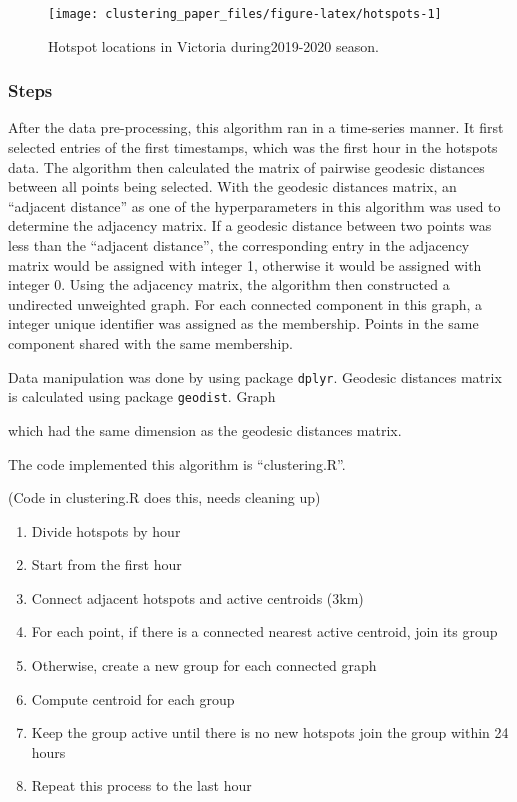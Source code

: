 \begin{Schunk}
\begin{figure}
\texttt{[image: clustering\_paper\_files/figure-latex/hotspots-1]} \caption[Hotspot locations in Victoria during2019-2020 season]{Hotspot locations in Victoria during2019-2020 season.}\label{fig:hotspots}
\end{figure}
\end{Schunk}

\hypertarget{steps}{%
\subsubsection{Steps}\label{steps}}

After the data pre-processing, this algorithm ran in a time-series
manner. It first selected entries of the first timestamps, which was the
first hour in the hotspots data. The algorithm then calculated the
matrix of pairwise geodesic distances between all points being selected.
With the geodesic distances matrix, an ``adjacent distance'' as one of
the hyperparameters in this algorithm was used to determine the
adjacency matrix. If a geodesic distance between two points was less
than the ``adjacent distance'', the corresponding entry in the adjacency
matrix would be assigned with integer 1, otherwise it would be assigned
with integer 0. Using the adjacency matrix, the algorithm then
constructed a undirected unweighted graph. For each connected component
in this graph, a integer unique identifier was assigned as the
membership. Points in the same component shared with the same
membership.

Data manipulation was done by using package \texttt{dplyr}. Geodesic
distances matrix is calculated using package \texttt{geodist}. Graph

which had the same dimension as the geodesic distances matrix.

The code implemented this algorithm is ``clustering.R''.

(Code in clustering.R does this, needs cleaning up)

\begin{enumerate}
\def\labelenumi{\arabic{enumi}.}
\tightlist
\item
  Divide hotspots by hour
\item
  Start from the first hour
\item
  Connect adjacent hotspots and active centroids (3km)
\item
  For each point, if there is a connected nearest active centroid, join
  its group
\item
  Otherwise, create a new group for each connected graph
\item
  Compute centroid for each group
\item
  Keep the group active until there is no new hotspots join the group
  within 24 hours
\item
  Repeat this process to the last hour
\end{enumerate}

